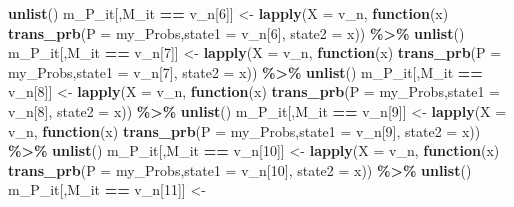 \documentclass[
]{article}
\newenvironment{Shaded}{\begin{snugshade}}{\end{snugshade}}
\newcommand{\AttributeTok}[1]{\textcolor[rgb]{0.13,0.29,0.53}{#1}}
\newcommand{\ControlFlowTok}[1]{\textcolor[rgb]{0.13,0.29,0.53}{\textbf{#1}}}
\newcommand{\DecValTok}[1]{\textcolor[rgb]{0.00,0.00,0.81}{#1}}
\newcommand{\FunctionTok}[1]{\textcolor[rgb]{0.13,0.29,0.53}{\textbf{#1}}}
\newcommand{\NormalTok}[1]{#1}
\newcommand{\OtherTok}[1]{\textcolor[rgb]{0.56,0.35,0.01}{#1}}
\newcommand{\SpecialCharTok}[1]{\textcolor[rgb]{0.81,0.36,0.00}{\textbf{#1}}}
\begin{document}
\begin{Shaded}
\begin{Highlighting}[]
    \FunctionTok{unlist}\NormalTok{() }
\NormalTok{  m\_P\_it[,M\_it }\SpecialCharTok{==}\NormalTok{ v\_n[}\DecValTok{6}\NormalTok{]]   }\OtherTok{\textless{}{-}} 
    \FunctionTok{lapply}\NormalTok{(}\AttributeTok{X =}\NormalTok{ v\_n, }\ControlFlowTok{function}\NormalTok{(x) }\FunctionTok{trans\_prb}\NormalTok{(}\AttributeTok{P =}\NormalTok{ my\_Probs,}\AttributeTok{state1 =}\NormalTok{ v\_n[}\DecValTok{6}\NormalTok{], }\AttributeTok{state2 =}\NormalTok{ x)) }\SpecialCharTok{\%\textgreater{}\%} 
    \FunctionTok{unlist}\NormalTok{() }
\NormalTok{  m\_P\_it[,M\_it }\SpecialCharTok{==}\NormalTok{ v\_n[}\DecValTok{7}\NormalTok{]]   }\OtherTok{\textless{}{-}} 
    \FunctionTok{lapply}\NormalTok{(}\AttributeTok{X =}\NormalTok{ v\_n, }\ControlFlowTok{function}\NormalTok{(x) }\FunctionTok{trans\_prb}\NormalTok{(}\AttributeTok{P =}\NormalTok{ my\_Probs,}\AttributeTok{state1 =}\NormalTok{ v\_n[}\DecValTok{7}\NormalTok{], }\AttributeTok{state2 =}\NormalTok{ x)) }\SpecialCharTok{\%\textgreater{}\%} 
    \FunctionTok{unlist}\NormalTok{() }
\NormalTok{  m\_P\_it[,M\_it }\SpecialCharTok{==}\NormalTok{ v\_n[}\DecValTok{8}\NormalTok{]]   }\OtherTok{\textless{}{-}} 
    \FunctionTok{lapply}\NormalTok{(}\AttributeTok{X =}\NormalTok{ v\_n, }\ControlFlowTok{function}\NormalTok{(x) }\FunctionTok{trans\_prb}\NormalTok{(}\AttributeTok{P =}\NormalTok{ my\_Probs,}\AttributeTok{state1 =}\NormalTok{ v\_n[}\DecValTok{8}\NormalTok{], }\AttributeTok{state2 =}\NormalTok{ x)) }\SpecialCharTok{\%\textgreater{}\%} 
    \FunctionTok{unlist}\NormalTok{() }
\NormalTok{  m\_P\_it[,M\_it }\SpecialCharTok{==}\NormalTok{ v\_n[}\DecValTok{9}\NormalTok{]]   }\OtherTok{\textless{}{-}} 
    \FunctionTok{lapply}\NormalTok{(}\AttributeTok{X =}\NormalTok{ v\_n, }\ControlFlowTok{function}\NormalTok{(x) }\FunctionTok{trans\_prb}\NormalTok{(}\AttributeTok{P =}\NormalTok{ my\_Probs,}\AttributeTok{state1 =}\NormalTok{ v\_n[}\DecValTok{9}\NormalTok{], }\AttributeTok{state2 =}\NormalTok{ x)) }\SpecialCharTok{\%\textgreater{}\%} 
    \FunctionTok{unlist}\NormalTok{() }
\NormalTok{  m\_P\_it[,M\_it }\SpecialCharTok{==}\NormalTok{ v\_n[}\DecValTok{10}\NormalTok{]]  }\OtherTok{\textless{}{-}} 
    \FunctionTok{lapply}\NormalTok{(}\AttributeTok{X =}\NormalTok{ v\_n, }\ControlFlowTok{function}\NormalTok{(x) }\FunctionTok{trans\_prb}\NormalTok{(}\AttributeTok{P =}\NormalTok{ my\_Probs,}\AttributeTok{state1 =}\NormalTok{ v\_n[}\DecValTok{10}\NormalTok{], }\AttributeTok{state2 =}\NormalTok{ x)) }\SpecialCharTok{\%\textgreater{}\%} 
    \FunctionTok{unlist}\NormalTok{() }
\NormalTok{  m\_P\_it[,M\_it }\SpecialCharTok{==}\NormalTok{ v\_n[}\DecValTok{11}\NormalTok{]]  }\OtherTok{\textless{}{-}} 

\end{Highlighting}
\end{Shaded}
\end{document}
